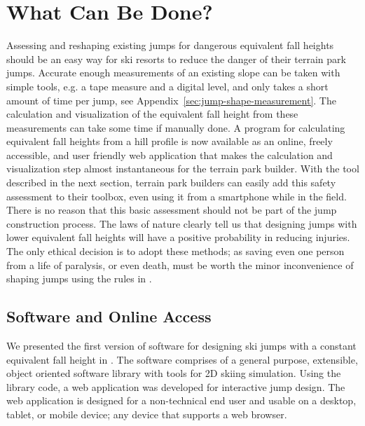 \documentclass[smallextended]{svjour3}       %
\begin{document}
\section{What Can Be Done?}
\label{sec:action}
%
Assessing and reshaping existing jumps for dangerous equivalent fall heights
should be an easy way for ski resorts to reduce the danger of their terrain
park jumps. Accurate enough measurements of an existing slope can be taken with
simple tools, e.g. a tape measure and a digital level, and only takes a short
amount of time per jump, see Appendix~\ref{sec:jump-shape-measurement}.  The
calculation and visualization of the equivalent fall height from these
measurements can take some time if manually done. A program for calculating
equivalent fall heights from a hill profile is now available as an online,
freely accessible, and user friendly web application that makes the calculation
and visualization step almost instantaneous for the terrain park builder. With
the tool described in the next section, terrain park builders can easily add
this safety assessment to their toolbox, even using it from a smartphone while
in the field. There is no reason that this basic assessment should not be part
of the jump construction process. The laws of nature clearly tell us that
designing jumps with lower equivalent fall heights will have a positive
probability in reducing injuries. The only ethical decision is to adopt these
methods; as saving even one person from a life of paralysis, or even death,
must be worth the minor inconvenience of shaping jumps using the rules
in \cite{Levy2015}.


\subsection{Software and Online Access}
\label{sec:software}
%
We presented the first version of software for designing ski jumps with a
constant equivalent fall height in \cite{Moore2018}. The software comprises of
a general purpose, extensible, object oriented software library with tools for
2D skiing simulation. Using the library code, a web application was developed
for interactive jump design. The web application is designed for a
non-technical end user and usable on a desktop, tablet, or mobile device; any
device that supports a web browser.
\end{document}
